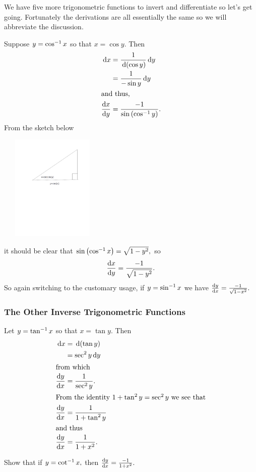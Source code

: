 We have five more trigonometric functions to invert and differentiate
so let's get going. Fortunately the derivations are all essentially
the same so we will abbreviate the discussion.

Suppose $y=\cos^{-1} x$ so that $x=\cos y.$ Then
\begin{align*}
  \thinspace{\rm d}x &= \frac{1}{\thinspace{\rm d}(\cos y)}\thinspace{\rm d}y\\
  &= \frac{1}{-\sin y}\thinspace{\rm d}y\\
\intertext{and thus,}
  \frac{\text{d}{x}}{\text{d}{y}} &= \frac{-1}{\sin \left(\cos^{-1} y\right)}.\\
\end{align*}
From the sketch below

\centerline{\includegraphics*[height=2in,width=2in]{Figures/arccos1}}
it should be clear that $\sin\left(\cos^{-1} x\right)=
\sqrt{1-y^2},$ so
$$
  \frac{\text{d}{x}}{\text{d}{y}} = \frac{-1}{\sqrt{1-y^2}}.
$$
So again switching to the customary usage, if $y=\sin^{-1} x$ we have $\frac{\text{d}{y}}{\text{d}{x}} = \frac{-1}{\sqrt{1-x^2}}.$ 

\subsubsection{The Other Inverse Trigonometric Functions}
\label{subsubsec:other-inverse-trig}

Let $y=\tan^{-1} x$ so that $x=\tan y.$ Then
\begin{align*}
  \thinspace{\rm d}x &= \thinspace{\rm d}(\tan y)\\
       &= \sec^2 y\thinspace{\rm d}y\\
\intertext{from which}
\frac{\text{d}{y}}{\text{d}{x}}  &= \frac{1}{\sec^2y}.\\
\intertext{From the identity $1+\tan^2y=\sec^2y$ we see that}
\frac{\text{d}{ y}}{\text{d}{x}}&= \frac{1}{1+\tan^2y}\\
\intertext{and thus}
  \frac{\text{d}{ y}}{\text{d}{x}} &= \frac{1}{1+x^2}.
\end{align*}

\begin{embeddedproblem}{}
  Show that if $y=\cot^{-1} x,$ then  $\frac{\text{d}{ y}}{\text{d}{x}} = \frac{-1}{1+x^2}.$
\end{embeddedproblem}

